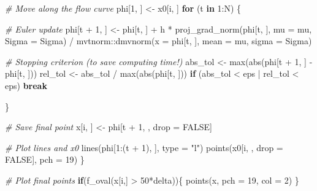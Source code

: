 \documentclass[
]{article}
\newenvironment{Shaded}{\begin{snugshade}}{\end{snugshade}}
\newcommand{\AttributeTok}[1]{\textcolor[rgb]{0.77,0.63,0.00}{#1}}
\newcommand{\CommentTok}[1]{\textcolor[rgb]{0.56,0.35,0.01}{\textit{#1}}}
\newcommand{\ConstantTok}[1]{\textcolor[rgb]{0.00,0.00,0.00}{#1}}
\newcommand{\ControlFlowTok}[1]{\textcolor[rgb]{0.13,0.29,0.53}{\textbf{#1}}}
\newcommand{\DecValTok}[1]{\textcolor[rgb]{0.00,0.00,0.81}{#1}}
\newcommand{\FunctionTok}[1]{\textcolor[rgb]{0.00,0.00,0.00}{#1}}
\newcommand{\NormalTok}[1]{#1}
\newcommand{\OtherTok}[1]{\textcolor[rgb]{0.56,0.35,0.01}{#1}}
\newcommand{\SpecialCharTok}[1]{\textcolor[rgb]{0.00,0.00,0.00}{#1}}
\newcommand{\StringTok}[1]{\textcolor[rgb]{0.31,0.60,0.02}{#1}}
\begin{document}
\begin{Shaded}
\begin{Highlighting}[]
  \CommentTok{\# Move along the flow curve}
\NormalTok{  phi[}\DecValTok{1}\NormalTok{, ] }\OtherTok{\textless{}{-}}\NormalTok{ x0[i, ]}
  \ControlFlowTok{for}\NormalTok{ (t }\ControlFlowTok{in} \DecValTok{1}\SpecialCharTok{:}\NormalTok{N) \{}
    
    \CommentTok{\# Euler update}
\NormalTok{      phi[t }\SpecialCharTok{+} \DecValTok{1}\NormalTok{, ] }\OtherTok{\textless{}{-}}\NormalTok{ phi[t, ] }\SpecialCharTok{+} 
\NormalTok{        h }\SpecialCharTok{*} \FunctionTok{proj\_grad\_norm}\NormalTok{(phi[t, ], }\AttributeTok{mu =}\NormalTok{ mu, }\AttributeTok{Sigma =}\NormalTok{ Sigma) }\SpecialCharTok{/}
\NormalTok{        mvtnorm}\SpecialCharTok{::}\FunctionTok{dmvnorm}\NormalTok{(}\AttributeTok{x =}\NormalTok{ phi[t, ], }\AttributeTok{mean =}\NormalTok{ mu, }\AttributeTok{sigma =}\NormalTok{ Sigma)}
      
      \CommentTok{\# Stopping criterion (to save computing time!)}
\NormalTok{      abs\_tol }\OtherTok{\textless{}{-}} \FunctionTok{max}\NormalTok{(}\FunctionTok{abs}\NormalTok{(phi[t }\SpecialCharTok{+} \DecValTok{1}\NormalTok{, ] }\SpecialCharTok{{-}}\NormalTok{ phi[t, ]))}
\NormalTok{      rel\_tol }\OtherTok{\textless{}{-}}\NormalTok{ abs\_tol }\SpecialCharTok{/} \FunctionTok{max}\NormalTok{(}\FunctionTok{abs}\NormalTok{(phi[t, ]))}
      \ControlFlowTok{if}\NormalTok{ (abs\_tol }\SpecialCharTok{\textless{}}\NormalTok{ eps }\SpecialCharTok{|}\NormalTok{ rel\_tol }\SpecialCharTok{\textless{}}\NormalTok{ eps) }\ControlFlowTok{break}
      
\NormalTok{  \}}
  
  \CommentTok{\# Save final point}
\NormalTok{  x[i, ] }\OtherTok{\textless{}{-}}\NormalTok{ phi[t }\SpecialCharTok{+} \DecValTok{1}\NormalTok{, , drop }\OtherTok{=} \ConstantTok{FALSE}\NormalTok{]}

    
  \CommentTok{\# Plot lines and x0}
  \FunctionTok{lines}\NormalTok{(phi[}\DecValTok{1}\SpecialCharTok{:}\NormalTok{(t }\SpecialCharTok{+} \DecValTok{1}\NormalTok{), ], }\AttributeTok{type =} \StringTok{"l"}\NormalTok{) }
  \FunctionTok{points}\NormalTok{(x0[i, , }\AttributeTok{drop =} \ConstantTok{FALSE}\NormalTok{], }\AttributeTok{pch =} \DecValTok{19}\NormalTok{)}
\NormalTok{\}}

\CommentTok{\# Plot final points}
\ControlFlowTok{if}\NormalTok{(}\FunctionTok{f\_oval}\NormalTok{(x[i,] }\SpecialCharTok{\textgreater{}} \DecValTok{50}\SpecialCharTok{*}\NormalTok{delta))\{}
\FunctionTok{points}\NormalTok{(x, }\AttributeTok{pch =} \DecValTok{19}\NormalTok{, }\AttributeTok{col =} \DecValTok{2}\NormalTok{)}
\NormalTok{\}}
\end{Highlighting}
\end{Shaded}
\end{document}
